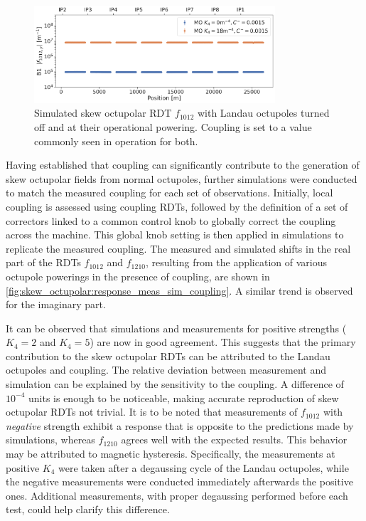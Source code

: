 \begin{figure}[!htb]
    \centering
    \includegraphics[width=0.8\textwidth]{./images/skew_octupoles/f1012_AMP_full_mo_with_coupling.pdf}
    \caption{Simulated skew octupolar RDT $f_{1012}$ with Landau octupoles turned off and at their
    operational powering. Coupling is set to a value commonly seen in operation for both.}
    \label{fig:skew_octupolar:mo_full_power_coupling_simulation}
\end{figure}


Having established that coupling can significantly contribute to the generation of skew octupolar
fields from normal octupoles, further simulations were conducted to match the measured coupling for
each set of observations. Initially, local coupling is assessed using coupling RDTs, followed by the
definition of a set of correctors linked to a common control knob to globally correct the coupling
across the machine. This global knob setting is then applied in simulations to replicate the
measured coupling.
The measured and simulated shifts in the real part of the RDTs $f_{1012}$ and $f_{1210}$, resulting
from the application of various octupole powerings in the presence of coupling, are shown in
\cref{fig:skew_octupolar:response_meas_sim_coupling}. A similar trend is observed for the imaginary
part.

It can be observed that simulations and measurements for positive strengths ($K_4=2$ and $K_4=5$) 
are now in good agreement. This suggests that the primary contribution to the skew octupolar RDTs
can be attributed to the Landau octupoles and coupling. The relative deviation between measurement
and simulation can be explained by the sensitivity to the coupling. A difference of $10^{-4}$ units 
is enough to be noticeable, making accurate reproduction of skew octupolar RDTs not trivial.
%
It is to be noted that measurements of $f_{1012}$ with \textit{negative} strength exhibit a
response that is opposite to the predictions made by simulations, whereas $f_{1210}$ agrees well
with the expected results. This behavior may be attributed to magnetic hysteresis. Specifically, the
measurements at positive $K_4$ were taken after a degaussing cycle of the Landau octupoles, while
the negative measurements were conducted immediately afterwards the positive ones. Additional
measurements, with proper degaussing performed before each test, could help clarify this difference.

